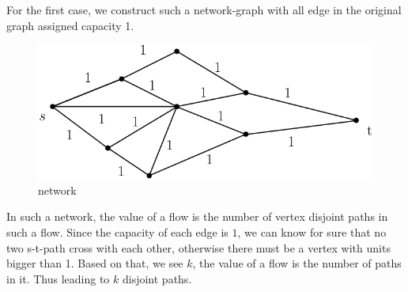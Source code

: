 \documentclass[UTF8]{ctexart}
\begin{document}
    For the first case, we construct such a network-graph with all edge in the original graph assigned capacity 1.
    \begin{figure}[h]
        \centering
        \includegraphics[scale=0.3]{figs/123.png}
        \caption{network}
    \end{figure}
    In such a network, the value of a flow is the number of vertex disjoint paths in such a flow. 
    Since the capacity of each edge is $1$, we can know for sure that no two s-t-path cross with each other,
    otherwise there must be a vertex with units bigger than 1. Based on that, we see $k$, the value of a flow 
    is the number of paths in it. Thus leading to $k$ disjoint paths.
\end{document}
